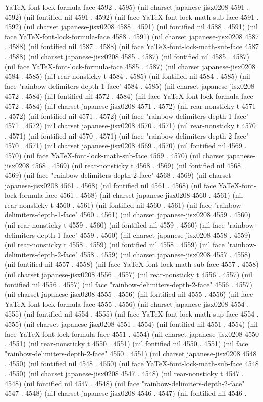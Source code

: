 YaTeX-font-lock-formula-face 4592 . 4595) (nil charset japanese-jisx0208 4591 . 4592) (nil fontified nil 4591 . 4592) (nil face YaTeX-font-lock-math-sub-face 4591 . 4592) (nil charset japanese-jisx0208 4588 . 4591) (nil fontified nil 4588 . 4591) (nil face YaTeX-font-lock-formula-face 4588 . 4591) (nil charset japanese-jisx0208 4587 . 4588) (nil fontified nil 4587 . 4588) (nil face YaTeX-font-lock-math-sub-face 4587 . 4588) (nil charset japanese-jisx0208 4585 . 4587) (nil fontified nil 4585 . 4587) (nil face YaTeX-font-lock-formula-face 4585 . 4587) (nil charset japanese-jisx0208 4584 . 4585) (nil rear-nonsticky t 4584 . 4585) (nil fontified nil 4584 . 4585) (nil face "rainbow-delimiters-depth-1-face" 4584 . 4585) (nil charset japanese-jisx0208 4572 . 4584) (nil fontified nil 4572 . 4584) (nil face YaTeX-font-lock-formula-face 4572 . 4584) (nil charset japanese-jisx0208 4571 . 4572) (nil rear-nonsticky t 4571 . 4572) (nil fontified nil 4571 . 4572) (nil face "rainbow-delimiters-depth-1-face" 4571 . 4572) (nil charset japanese-jisx0208 4570 . 4571) (nil rear-nonsticky t 4570 . 4571) (nil fontified nil 4570 . 4571) (nil face "rainbow-delimiters-depth-2-face" 4570 . 4571) (nil charset japanese-jisx0208 4569 . 4570) (nil fontified nil 4569 . 4570) (nil face YaTeX-font-lock-math-sub-face 4569 . 4570) (nil charset japanese-jisx0208 4568 . 4569) (nil rear-nonsticky t 4568 . 4569) (nil fontified nil 4568 . 4569) (nil face "rainbow-delimiters-depth-2-face" 4568 . 4569) (nil charset japanese-jisx0208 4561 . 4568) (nil fontified nil 4561 . 4568) (nil face YaTeX-font-lock-formula-face 4561 . 4568) (nil charset japanese-jisx0208 4560 . 4561) (nil rear-nonsticky t 4560 . 4561) (nil fontified nil 4560 . 4561) (nil face "rainbow-delimiters-depth-1-face" 4560 . 4561) (nil charset japanese-jisx0208 4559 . 4560) (nil rear-nonsticky t 4559 . 4560) (nil fontified nil 4559 . 4560) (nil face "rainbow-delimiters-depth-1-face" 4559 . 4560) (nil charset japanese-jisx0208 4558 . 4559) (nil rear-nonsticky t 4558 . 4559) (nil fontified nil 4558 . 4559) (nil face "rainbow-delimiters-depth-2-face" 4558 . 4559) (nil charset japanese-jisx0208 4557 . 4558) (nil fontified nil 4557 . 4558) (nil face YaTeX-font-lock-math-sub-face 4557 . 4558) (nil charset japanese-jisx0208 4556 . 4557) (nil rear-nonsticky t 4556 . 4557) (nil fontified nil 4556 . 4557) (nil face "rainbow-delimiters-depth-2-face" 4556 . 4557) (nil charset japanese-jisx0208 4555 . 4556) (nil fontified nil 4555 . 4556) (nil face YaTeX-font-lock-formula-face 4555 . 4556) (nil charset japanese-jisx0208 4554 . 4555) (nil fontified nil 4554 . 4555) (nil face YaTeX-font-lock-math-sup-face 4554 . 4555) (nil charset japanese-jisx0208 4551 . 4554) (nil fontified nil 4551 . 4554) (nil face YaTeX-font-lock-formula-face 4551 . 4554) (nil charset japanese-jisx0208 4550 . 4551) (nil rear-nonsticky t 4550 . 4551) (nil fontified nil 4550 . 4551) (nil face "rainbow-delimiters-depth-2-face" 4550 . 4551) (nil charset japanese-jisx0208 4548 . 4550) (nil fontified nil 4548 . 4550) (nil face YaTeX-font-lock-math-sub-face 4548 . 4550) (nil charset japanese-jisx0208 4547 . 4548) (nil rear-nonsticky t 4547 . 4548) (nil fontified nil 4547 . 4548) (nil face "rainbow-delimiters-depth-2-face" 4547 . 4548) (nil charset japanese-jisx0208 4546 . 4547) (nil fontified nil 4546 . 